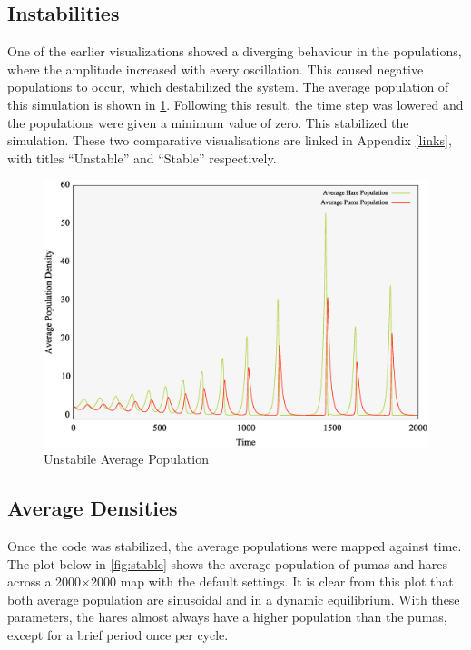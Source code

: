 \documentclass[a4paper,11pt]{article}
\begin{document}
\subsection{Instabilities}

One of the earlier visualizations showed a diverging behaviour in the populations, where the amplitude increased with every oscillation.  This caused negative populations to occur, which destabilized the system.  The average population of this simulation is shown in \ref{fig:unstable}.  Following this result, the time step was lowered and the populations were given a minimum value of zero.  This stabilized the simulation.  These two comparative visualisations are linked in Appendix \ref{links}, with titles ``Unstable'' and ``Stable'' respectively. 

\begin{figure}[h]
\includegraphics[width=\textwidth]{unstable.eps}
\caption{Unstabile Average Population}
\label{fig:unstable}
\end{figure}
 

\subsection{Average Densities} 
Once the code was stabilized, the average populations were mapped against time.  The plot below in \ref{fig:stable} shows the average population of pumas and hares across a 2000$\times$2000 map with the default settings.  It is clear from this plot that both average population are sinusoidal and in a dynamic equilibrium.  With these parameters, the hares almost always have a higher population than the pumas, except for a brief period once per cycle.  
 
\end{document}
